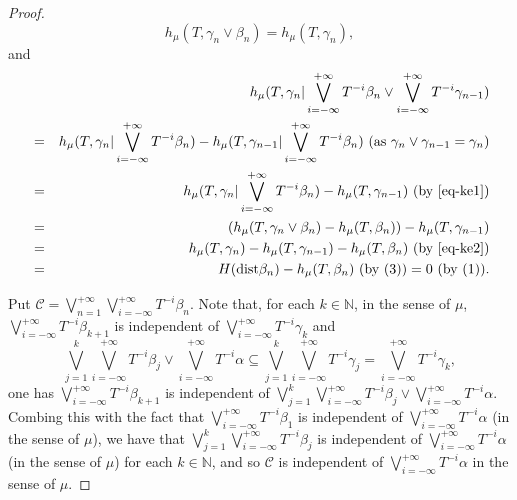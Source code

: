 \documentclass[12pt]{amsart}
\theoremstyle{definition} \theoremstyle{question}
\numberwithin{equation}{section}
\begin{document}
\begin{proof}
\begin{equation}\label{eq-ke2}
h_\mu (T, \gamma_n\vee \beta_n)= h_\mu (T, \gamma_n),
\end{equation}
and
\begin{eqnarray} \label{eq-keke}
& & h_\mu (T, \gamma_n| \bigvee_{i= - \infty}^{+ \infty} T^{- i}
\beta_n\vee \bigvee_{i= - \infty}^{+ \infty}
T^{- i} \gamma_{n- 1})\nonumber \\
&= & h_\mu (T, \gamma_n| \bigvee_{i= - \infty}^{+ \infty} T^{- i}
\beta_n)- h_\mu (T, \gamma_{n- 1}| \bigvee_{i= - \infty}^{+ \infty}
T^{- i} \beta_n)\ (\text{as}\ \gamma_n\vee \gamma_{n- 1}= \gamma_n)\nonumber \\
&= & h_\mu (T, \gamma_n| \bigvee_{i= - \infty}^{+ \infty} T^{- i} \beta_n)-
h_\mu (T, \gamma_{n- 1})\ (\text{by \eqref{eq-ke1}})\nonumber \\
&= & (h_\mu (T, \gamma_n\vee
\beta_n)- h_\mu (T, \beta_n))- h_\mu (T, \gamma_{n- 1})\nonumber \\
&= & h_\mu (T, \gamma_n)- h_\mu (T, \gamma_{n- 1})- h_\mu (T, \beta_n)\
(\text{by \eqref{eq-ke2}})\nonumber \\
&= & H (\text{dist} \beta_n)- h_\mu (T, \beta_n)\ (\text{by
(3)}) =0\ (\text{by (1)}).
\end{eqnarray}

Put $\mathcal{C}= \bigvee_{n= 1}^{+ \infty} \bigvee_{i= - \infty}^{+
\infty} T^{- i} \beta_n$. Note that, for each $k\in {\mathbb N}$, in the
sense of $\mu$, $\bigvee_{i= - \infty}^{+ \infty} T^{- i} \beta_{k+
1}$ is independent of $\bigvee_{i= - \infty}^{+ \infty} T^{- i}
\gamma_k$ and
$$\bigvee_{j= 1}^k \bigvee_{i= - \infty}^{+ \infty}
T^{- i} \beta_{j}\vee \bigvee_{i= - \infty}^{+ \infty} T^{- i}
\alpha\subseteq \bigvee_{j= 1}^k \bigvee_{i= - \infty}^{+ \infty}
T^{- i} \gamma_{j}= \bigvee_{i= - \infty}^{+ \infty} T^{- i}
\gamma_{k},$$
one has $\bigvee_{i=- \infty}^{+ \infty} T^{- i}
\beta_{k+ 1}$ is independent of $\bigvee_{j= 1}^k \bigvee_{i= -
\infty}^{+ \infty} T^{- i} \beta_j\vee \bigvee_{i= - \infty}^{+
\infty} T^{- i} \alpha$. Combing this with the fact that
$\bigvee_{i= - \infty}^{+ \infty} T^{- i} \beta_1$ is independent of
$\bigvee_{i= -\infty}^{+ \infty} T^{- i} \alpha$ (in the sense of
$\mu$), we have that $\bigvee_{j= 1}^k \bigvee_{i= - \infty}^{+
\infty} T^{- i} \beta_j$ is independent of $\bigvee_{i= - \infty}^{+
\infty} T^{- i} \alpha$ (in the sense of $\mu$) for each $k\in
\mathbb{N}$, and so $\mathcal{C}$ is independent of $\bigvee_{i= -
\infty}^{+ \infty} T^{- i} \alpha$ in the sense of $\mu$.


\end{proof}
\end{document}
